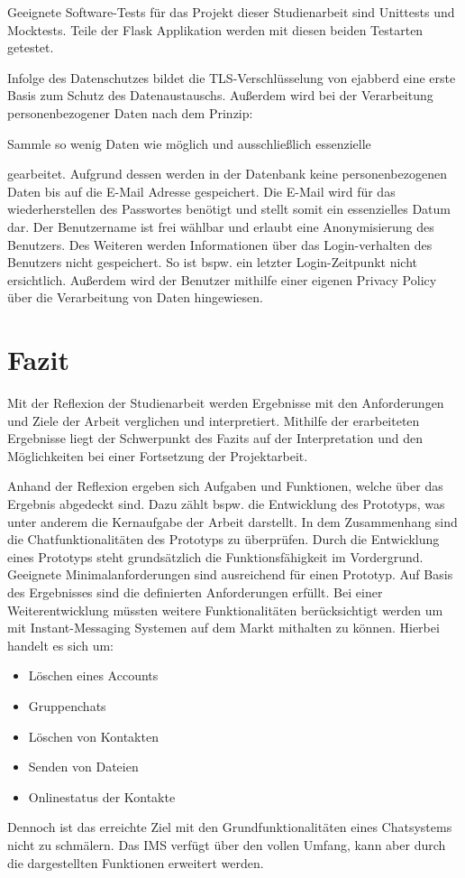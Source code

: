 \documentclass[a4paper,titlepage,halfparskip,12pt]{scrreprt}
\begin{document}
\begin{onehalfspacing}
Geeignete Software-Tests für das Projekt dieser Studienarbeit sind Unittests und Mocktests. Teile der Flask Applikation werden mit diesen beiden Testarten getestet.

Infolge des Datenschutzes bildet die TLS-Verschlüsselung von ejabberd eine erste Basis zum Schutz des Datenaustauschs. Außerdem wird bei der Verarbeitung personenbezogener Daten nach dem Prinzip:
\begin{center}
	\glqq Sammle so wenig Daten wie möglich und ausschließlich essenzielle\grqq\
\end{center}
gearbeitet. Aufgrund dessen werden in der Datenbank keine personenbezogenen Daten bis auf die E-Mail Adresse gespeichert. Die E-Mail wird für das wiederherstellen des Passwortes benötigt und stellt somit ein essenzielles Datum dar. Der Benutzername ist frei wählbar und erlaubt eine Anonymisierung des Benutzers. Des Weiteren werden Informationen über das Login-verhalten des Benutzers nicht gespeichert. So ist bspw. ein letzter Login-Zeitpunkt nicht ersichtlich. Außerdem wird der Benutzer mithilfe einer eigenen Privacy Policy über die Verarbeitung von Daten hingewiesen.

\pagebreak

\chapter{Fazit}
\label{chap:Fazit}
Mit der Reflexion der Studienarbeit werden Ergebnisse mit den Anforderungen und Ziele der Arbeit verglichen und interpretiert. Mithilfe der erarbeiteten Ergebnisse liegt der Schwerpunkt des Fazits auf der Interpretation und den Möglichkeiten bei einer Fortsetzung der Projektarbeit.

Anhand der Reflexion ergeben sich Aufgaben und Funktionen, welche über das Ergebnis abgedeckt sind. Dazu zählt bspw. die Entwicklung des Prototyps, was unter anderem die Kernaufgabe der Arbeit darstellt. In dem Zusammenhang sind die Chatfunktionalitäten des Prototyps zu überprüfen. Durch die Entwicklung eines Prototyps steht grundsätzlich die Funktionsfähigkeit im Vordergrund. Geeignete Minimalanforderungen sind ausreichend für einen Prototyp. Auf Basis des Ergebnisses sind die definierten Anforderungen erfüllt. Bei einer Weiterentwicklung müssten weitere Funktionalitäten berücksichtigt werden um mit Instant-Messaging Systemen auf dem Markt mithalten zu können. Hierbei handelt es sich um:
\begin{itemize}
	\item Löschen eines Accounts
	\item Gruppenchats
	\item Löschen von Kontakten
	\item Senden von Dateien
	\item Onlinestatus der Kontakte
\end{itemize}
Dennoch ist das erreichte Ziel mit den Grundfunktionalitäten eines Chatsystems nicht zu schmälern. Das IMS verfügt über den vollen Umfang, kann aber durch die dargestellten Funktionen erweitert werden.


\end{onehalfspacing}
\end{document}
